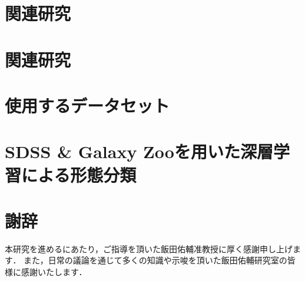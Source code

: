 \documentclass[a4j, 11pt]{jarticle}
\begin{document}
\newpage
\section{関連研究}

\newpage
\section{関連研究}

\newpage
\section{使用するデータセット}

\newpage
\section{SDSS \& Galaxy Zooを用いた深層学習による形態分類}

\newpage





\newpage
\nocite{*}                 %


\newpage
\section*{謝辞}
本研究を進めるにあたり，ご指導を頂いた飯田佑輔准教授に厚く感謝申し上げます．
また，日常の議論を通じて多くの知識や示唆を頂いた飯田佑輔研究室の皆様に感謝いたします．
\end{document}
